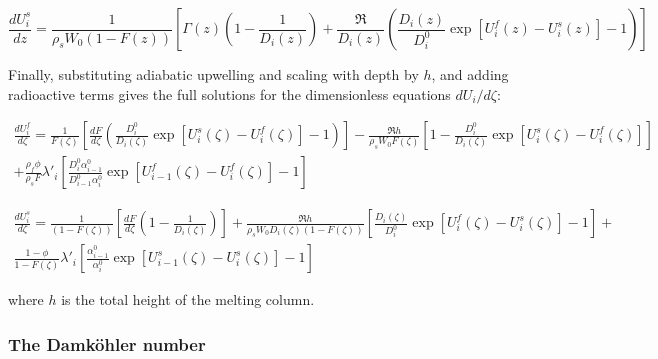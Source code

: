 \documentclass[draft]{agujournal2019}
\begin{document}
\begin{linenomath*}
\begin{equation}
    \frac{dU_i^s}{dz} = \frac{1}{\rho_s W_0 (1 - F(z))}\left[\Gamma(z) \left(1 - \frac{1}{D_i(z)}\right)+ \frac{\Re}{D_i(z)}\left(\frac{D_i(z)}{D_i^0} \exp[U_i^f(z) - U_i^s(z)] - 1\right) \right]\label{eq:47}
\end{equation}
\end{linenomath*}

Finally, substituting adiabatic upwelling and scaling with depth by $h$, and adding radioactive terms gives the full solutions for the dimensionless equations $dU_i/d\zeta$:

\begin{linenomath*}
\begin{equation}\label{eq:48}
    \begin{aligned}
    	\frac{dU_i^f}{d\zeta} = \frac{1}{F(\zeta)}\left[\frac{dF}{d\zeta}\left(\frac{D_i^0}{D_i(\zeta)}\exp[U_i^s(\zeta) - U_i^f(\zeta)] - 1\right)\right] - \frac{\Re h}{\rho_s W_0 F(\zeta)}\left[1 - \frac{D_i^0}{D_i(\zeta)}\exp[U_i^s(\zeta) - U_i^f(\zeta)]\right] \\
	+ \frac{\rho_f \phi}{\rho_s F}\lambda'_i \left[\frac{D_i^0 \alpha_{i-1}^0}{D_{i-1}^0 \alpha_i^0} \exp[U_{i-1}^f(\zeta) - U_i^f(\zeta)]-1\right]
    \end{aligned}
\end{equation}
\end{linenomath*}

\begin{linenomath*}
\begin{equation}\label{eq:49}
    \begin{aligned}
    	\frac{dU_i^s}{d\zeta} = \frac{1}{(1 - F(\zeta))}\left[\frac{dF}{d\zeta} \left(1 - \frac{1}{D_i(\zeta)}\right)\right]+ \frac{\Re h}{\rho_s W_0 D_i(\zeta)(1 - F(\zeta))}\left[\frac{D_i(\zeta)}{D_i^0} \exp[U_i^f(\zeta) - U_i^s(\zeta)] - 1 \right] + \\
	\frac{1-\phi}{1-F(\zeta)}\lambda'_i \left[\frac{\alpha_{i-1}^0}{\alpha_i^0} \exp[U_{i-1}^s(\zeta) - U_i^s(\zeta)]-1\right]
    \end{aligned}
\end{equation}
\end{linenomath*}

where $h$ is the total height of the melting column.


\subsubsection{The Damk\"{o}hler number}
\end{document}
